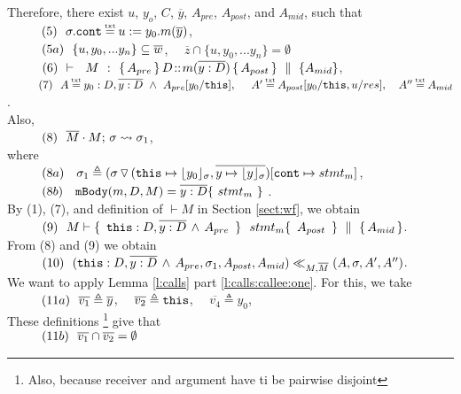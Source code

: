 \begin{description}
 Therefore, there exist $u$, $y_o$, $C$, $\overline y$,  $A_{pre}$, $A_{post}$, and $A_{mid}$, such that \\
 $\SPS (5) \ \ \sigma.\prg{cont}\txteq u:=y_0.m(\overline y)$,\\
$\strut \ \ \hspace{0.5cm} \ \  (5a) \ \ \{ u, y_0, ... y_n \}  \subseteq \overline w $, \ \ $\overline z \cap  \{ u, y_0, ... y_n \}  = \emptyset$ \\ 
$\strut \ \ \hspace{0.5cm} \ \  (6) \  \ {\vdash \ \ M\ \ \mathbf{:}\ \  \{\, A_{pre}\, \}\, D\!::\!m(\overline{y:D})\, \{\, A_{post}\, \} \, \,\parallel\,\, \{ A_{mid} \}}$, \\
$\SPS (7) \  \ A \txteq y_0:D ,\overline {y:D}\ \wedge \  A_{pre}[y_0/\prg{this}],\ \  \ \ 
A'  \txteq A_{post}[y_0/\prg{this},u/res],\ \ \ 
A'' \txteq  A_{mid}$. 
\\
Also, \\
$\strut \ \ \hspace{0.5cm} \ \  (8) \ \ \overline{M}\cdot M;\, {\sigma} \rightsquigarrow \sigma_1$, \\
 where \\
$\strut \ \ \hspace{0.5cm} \ \  (8a) \ \ \ \sigma_1\triangleq ( \sigma \, {\triangledown}\,  (\mbox{\normalfont{\texttt{this}}}\mapsto {\lfloor y_0 \rfloor_{\sigma}},{\overline{y \mapsto {\lfloor y \rfloor_{\sigma}}}}) [\mbox{\normalfont{\texttt{cont}}}\mapsto stmt_m]$, \\%
$\strut \ \ \hspace{0.5cm} \ \  (8b) \ \ \   \mbox{\normalfont{\texttt{mBody}}}(m,D,M)=\overline{y:D}\{\    stmt_m\ \}$ .\\
By (1), (7), and definition of $\vdash M$ in Section \ref{sect:wf}, we obtain\\
$\strut \ \ \hspace{0.5cm} \ \  (9) \ \ M \vdash   \{\,  \ \mbox{\normalfont{\texttt{this}}}:D,\overline{y:D}\, \wedge\, A_{pre}\   \, \}\ \ stmt_m  \{\, \ A_{post}\  \, \} \, \,\parallel\,\, \{\, A_{mid} \, \} $.\\
From (8) and (9) we obtain  \\
$\strut \ \ \hspace{0.5cm} \ \  (10) \ \ (\mbox{\normalfont{\texttt{this}}}:D,\overline{y:D}\, \wedge\, A_{pre},\sigma_1,A_{post}, A_{mid}) \ll_{M,\overline{M}} (A,\sigma,A', A'')$. 
\\
We want to apply Lemma   \ref{l:calls} part \ref{l:calls:callee:one}. For this, we take
\\
$\strut \ \ \hspace{0.5cm} \ \  (11a) \ \  \overline {v_1} \triangleq \overline y$, \ \ $\overline {v_2} \triangleq  \mbox{\normalfont{\texttt{this}}}$, \ \ $\overline {v_4} \triangleq  y_0$, 
\\
These definitions  \footnote{Also, because receiver and argument have ti be pairwise disjoint} give that 
\\
$\strut \ \ \hspace{0.5cm} \ \  (11b) \ \  \overline {v_1}\cap   \overline{v_2} = \emptyset $

\end{description}
